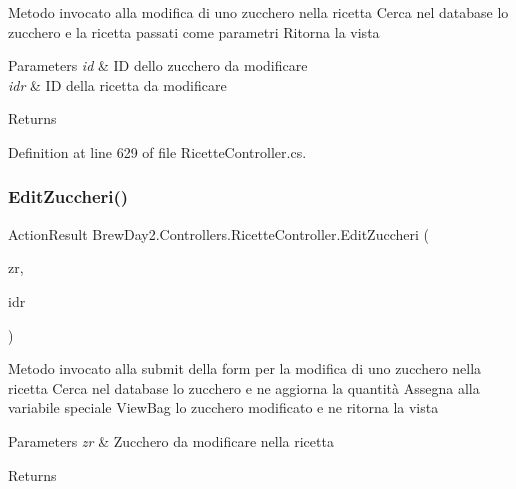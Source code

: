 Metodo invocato alla modifica di uno zucchero nella ricetta Cerca nel database lo zucchero e la ricetta passati come parametri Ritorna la vista 


\begin{DoxyParams}{Parameters}
{\em id} & ID dello zucchero da modificare\\
\hline
{\em idr} & ID della ricetta da modificare\\
\hline
\end{DoxyParams}
\begin{DoxyReturn}{Returns}

\end{DoxyReturn}


Definition at line 629 of file Ricette\+Controller.\+cs.

\mbox{\label{class_brew_day2_1_1_controllers_1_1_ricette_controller_a112bb278fc4c6fde7448fd99f9b9a114}} 
\subsubsection{\texorpdfstring{Edit\+Zuccheri()}{EditZuccheri()}\hspace{0.1cm}{\footnotesize\ttfamily [2/2]}}
{\footnotesize\ttfamily Action\+Result Brew\+Day2.\+Controllers.\+Ricette\+Controller.\+Edit\+Zuccheri (\begin{DoxyParamCaption}\item[{\mbox{\hyperlink{class_brew_day2_1_1_models_1_1_zuccheri_ricetta}{Zuccheri\+Ricetta}}}]{zr,  }\item[{int}]{idr }\end{DoxyParamCaption})}



Metodo invocato alla submit della form per la modifica di uno zucchero nella ricetta Cerca nel database lo zucchero e ne aggiorna la quantità Assegna alla variabile speciale View\+Bag lo zucchero modificato e ne ritorna la vista 


\begin{DoxyParams}{Parameters}
{\em zr} & Zucchero da modificare nella ricetta\\
\hline
\end{DoxyParams}
\begin{DoxyReturn}{Returns}

\end{DoxyReturn}


